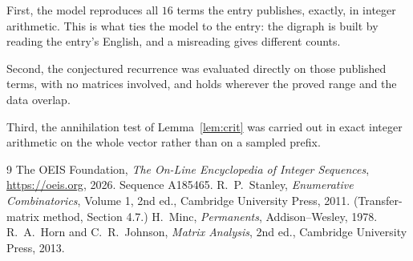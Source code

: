 \documentclass[11pt,a4paper]{article}
\theoremstyle{plain}
\theoremstyle{definition}
\begin{document}
First, the model reproduces all $16$ terms the entry publishes, exactly, in integer
arithmetic. This is what ties the model to the entry: the digraph is built by reading the
entry's English, and a misreading gives different counts.

Second, the conjectured recurrence was evaluated directly on those published terms, with no
matrices involved, and holds wherever the proved range and the data overlap.

Third, the annihilation test of Lemma~\ref{lem:crit} was carried out in exact integer
arithmetic on the whole vector rather than on a sampled prefix.

\begin{thebibliography}{9}
 The OEIS Foundation, \emph{The On-Line Encyclopedia of Integer
Sequences}, \url{https://oeis.org}, 2026. Sequence A185465.
 R.~P.~Stanley, \emph{Enumerative Combinatorics}, Volume 1, 2nd ed.,
Cambridge University Press, 2011. (Transfer-matrix method, Section 4.7.)
 H.~Minc, \emph{Permanents}, Addison--Wesley, 1978.
 R.~A.~Horn and C.~R.~Johnson, \emph{Matrix Analysis}, 2nd ed., Cambridge
University Press, 2013.
\end{thebibliography}
\end{document}
